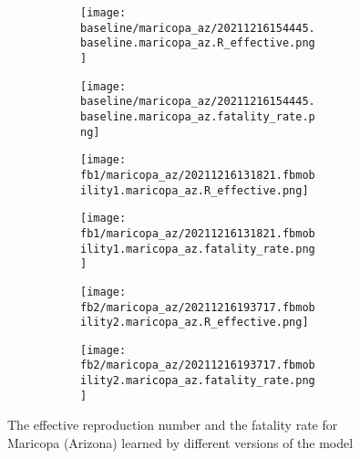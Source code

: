 \begin{figure}[!htb]
    \centering

    \begin{subfigure}[b]{\linewidth}
        \centering
        \begin{subfigure}[b]{0.4\linewidth}
            \texttt{[image: baseline/maricopa\_az/20211216154445.baseline.maricopa\_az.R\_effective.png]}
        \end{subfigure}
        \begin{subfigure}[b]{0.4\linewidth}
            \texttt{[image: baseline/maricopa\_az/20211216154445.baseline.maricopa\_az.fatality\_rate.png]}
        \end{subfigure}
    \end{subfigure}

    \begin{subfigure}[b]{\linewidth}
        \centering
        \begin{subfigure}[b]{0.4\linewidth}
            \texttt{[image: fb1/maricopa\_az/20211216131821.fbmobility1.maricopa\_az.R\_effective.png]}
        \end{subfigure}
        \begin{subfigure}[b]{0.4\linewidth}
            \texttt{[image: fb1/maricopa\_az/20211216131821.fbmobility1.maricopa\_az.fatality\_rate.png]}
        \end{subfigure}
    \end{subfigure}

    \begin{subfigure}[b]{\linewidth}
        \centering
        \begin{subfigure}[b]{0.4\linewidth}
            \texttt{[image: fb2/maricopa\_az/20211216193717.fbmobility2.maricopa\_az.R\_effective.png]}
        \end{subfigure}
        \begin{subfigure}[b]{0.4\linewidth}
            \texttt{[image: fb2/maricopa\_az/20211216193717.fbmobility2.maricopa\_az.fatality\_rate.png]}
        \end{subfigure}
    \end{subfigure}

    \caption{The effective reproduction number and the fatality rate for Maricopa (Arizona) learned by different versions of the model}
    \label{fig:R0-and-fatality-marico}
\end{figure}
